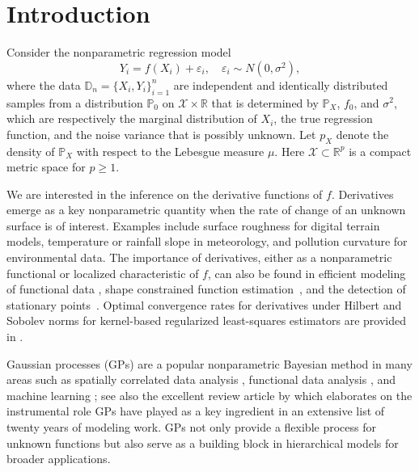 \documentclass[12pt]{article}
\newcommand\data{\mathbb{D}_n}
\newcommand{\PP}{\mathbb{P}}
\newcommand{\bbR}{\mathbb{R}}
\newcommand{\mX}{\mathcal{X}}
\theoremstyle{plain}
\theoremstyle{nonitalicremark}
\begin{document}
\newpage

\section{Introduction}

\sloppy

Consider the nonparametric regression model 
\begin{equation}\label{eq:model}
Y_i=f(X_i)+\varepsilon_i,\quad \varepsilon_i\sim N(0,\sigma^2),
\end{equation}
where the data $\data=\{X_i,Y_i\}_{i=1}^{n}$ are independent and identically distributed samples from a distribution $\PP_0$ on $\mX\times \bbR$ that is determined by $\PP_X$, $f_0$, and $\sigma^2$, which are respectively the marginal distribution of $X_i$, the true regression function, and the noise variance that is possibly unknown. Let $p_X$ denote the density of $\PP_X$ with respect to the Lebesgue measure $\mu$. Here $\mX\subset \bbR^p$ is a compact metric space for $p\geq 1$.



We are interested in the inference on the derivative functions of $f$. Derivatives emerge as a key nonparametric quantity when the rate of change of an unknown surface is of interest. Examples include surface roughness for digital terrain models, temperature or rainfall slope in meteorology, and pollution curvature for environmental data. The importance of derivatives, either as a nonparametric functional or localized characteristic of $f$, can also be found in efficient modeling of functional data \citep{dai2018derivative}, shape constrained function estimation~\citep{riihimaki2010gaussian, wang2016estimating}, and the detection of stationary points~\citep{yu2020bayesian}. Optimal convergence rates for derivatives under Hilbert and Sobolev norms for kernel-based regularized least-squares estimators are provided in \citep{blanchard2018optimal,fischer2020sobolev}.

Gaussian processes (GPs) are a popular nonparametric Bayesian method in many areas such as spatially correlated data analysis \citep{stein2012interpolation,gelfand2003spatial,banerjee2003directional}, functional data analysis \citep{shi2011gaussian}, and machine learning \citep{rasmussen2006}; see also the excellent review article by \cite{gelfand2016spatial} which elaborates on the instrumental role GPs have played as a key ingredient in an extensive list of twenty years of modeling work. GPs not only provide a flexible process for unknown functions but also serve as a building block in hierarchical models for broader applications. 
\end{document}
